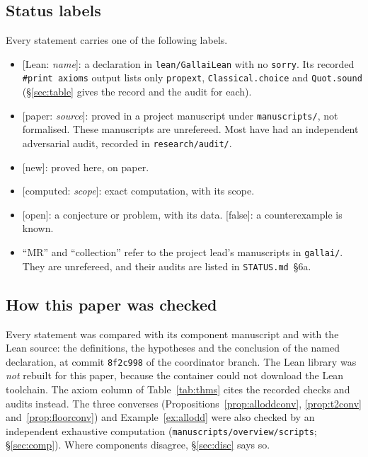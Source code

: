 \documentclass[11pt]{amsart}
\theoremstyle{definition}
\newcommand{\st}[1]{\textsf{\small[#1]}}
\begin{document}
\subsection{Status labels}
Every statement carries one of the following labels.
\begin{itemize}[leftmargin=*]
\item \st{Lean: \textit{name}}: a declaration in \texttt{lean/GallaiLean} with no \texttt{sorry}.
Its recorded \texttt{\#print axioms} output lists only \texttt{propext}, \texttt{Classical.choice}
and \texttt{Quot.sound} (\S\ref{sec:table} gives the record and the audit for each).
\item \st{paper: \textit{source}}: proved in a project manuscript under \texttt{manuscripts/}, not
formalised. These manuscripts are unrefereed. Most have had an independent adversarial audit,
recorded in \texttt{research/audit/}.
\item \st{new}: proved here, on paper.
\item \st{computed: \textit{scope}}: exact computation, with its scope.
\item \st{open}: a conjecture or problem, with its data. \st{false}: a counterexample is known.
\item ``MR'' and ``collection'' refer to the project lead's manuscripts in \texttt{gallai/}. They are
unrefereed, and their audits are listed in \texttt{STATUS.md}~\S6a.
\end{itemize}

\subsection*{How this paper was checked}
Every statement was compared with its component manuscript and with the Lean source: the
definitions, the hypotheses and the conclusion of the named declaration, at commit \texttt{8f2c998}
of the coordinator branch. The Lean library was \emph{not} rebuilt for this paper, because the
container could not download the Lean toolchain. The axiom column of Table~\ref{tab:thms} cites the
recorded checks and audits instead. The three converses
(Propositions~\ref{prop:alloddconv}, \ref{prop:t2conv} and~\ref{prop:floorconv}) and
Example~\ref{ex:allodd} were also checked by an independent exhaustive computation
(\texttt{manuscripts/overview/scripts}; \S\ref{sec:comp}). Where components disagree, \S\ref{sec:disc}
says so.
\end{document}
